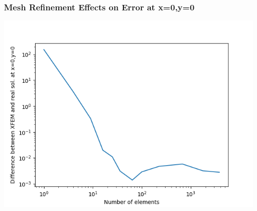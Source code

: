 \documentclass[]{beamer}
\begin{document}
\begin{frame}[t]\frametitle{Mesh Refinement Effects on Error at x=0,y=0}
	\begin{center}
		\includegraphics[scale=0.5]{figures/2D_xy_homog1mat_neumann_comp}
	\end{center}
\end{frame}
\end{document}
